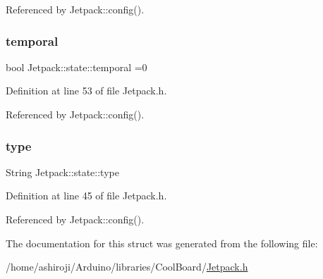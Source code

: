 Referenced by Jetpack\+::config().

\mbox{\label{structJetpack_1_1state_abd6039e7a48856550b0ffbf8bcff7bdd}} 
\subsubsection{\texorpdfstring{temporal}{temporal}}
{\footnotesize\ttfamily bool Jetpack\+::state\+::temporal =0}



Definition at line 53 of file Jetpack.\+h.



Referenced by Jetpack\+::config().

\mbox{\label{structJetpack_1_1state_a9143580871c2e573fb502bb94c1da8e5}} 
\subsubsection{\texorpdfstring{type}{type}}
{\footnotesize\ttfamily String Jetpack\+::state\+::type}



Definition at line 45 of file Jetpack.\+h.



Referenced by Jetpack\+::config().



The documentation for this struct was generated from the following file\+:\begin{DoxyCompactItemize}
\item 
/home/ashiroji/\+Arduino/libraries/\+Cool\+Board/\hyperlink{Jetpack_8h}{Jetpack.\+h}\end{DoxyCompactItemize}
